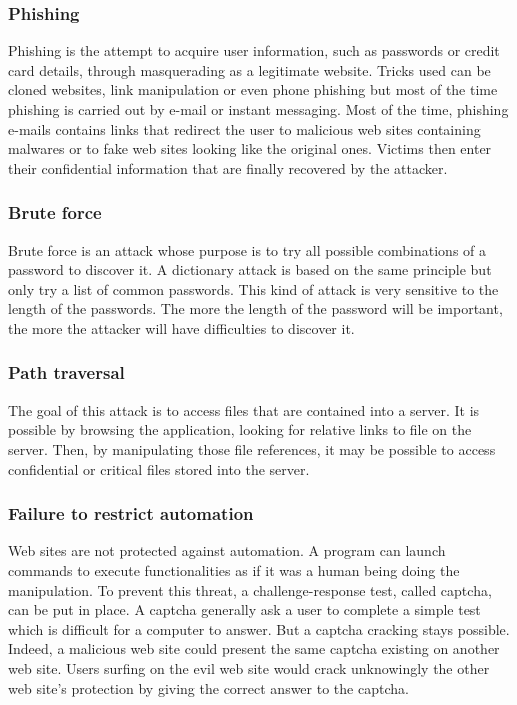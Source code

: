 \subsubsection{Phishing}
Phishing is the attempt to acquire user information, such as passwords or credit
card details, through masquerading as a legitimate website. Tricks used can be
cloned websites, link manipulation or even phone phishing but most of the time
phishing is carried out by e-mail or instant messaging. Most of the time,
phishing e-mails contains links that redirect the user to malicious web sites
containing malwares or to fake web sites looking like the original ones. Victims
then enter their confidential information that are finally recovered by the
attacker.

\subsubsection{Brute force}
Brute force is an attack whose purpose is to try all possible combinations of a
password to discover it. A dictionary attack is based on the same principle but
only try a list of common passwords. This kind of attack is very sensitive to
the length of the passwords. The more the length of the password will be
important, the more the attacker will have difficulties to discover it.

\subsubsection{Path traversal}
The goal of this attack is to access files that are contained into a server. It
is possible by browsing the application, looking for relative links to file on
the server. Then, by manipulating those file references, it may be possible to
access confidential or critical files stored into the server.

\subsubsection{Failure to restrict automation}
Web sites are not protected against automation. A program can launch commands to
execute functionalities as if it was a human being doing the manipulation. To
prevent this threat, a challenge-response test, called captcha, can be put in
place. A captcha generally ask a user to complete a simple test which is
difficult for a computer to answer. But a captcha cracking stays possible.
Indeed, a malicious web site could present the same captcha existing on another
web site. Users surfing on the evil web site would crack unknowingly the other
web site's protection by giving the correct answer to the captcha.


